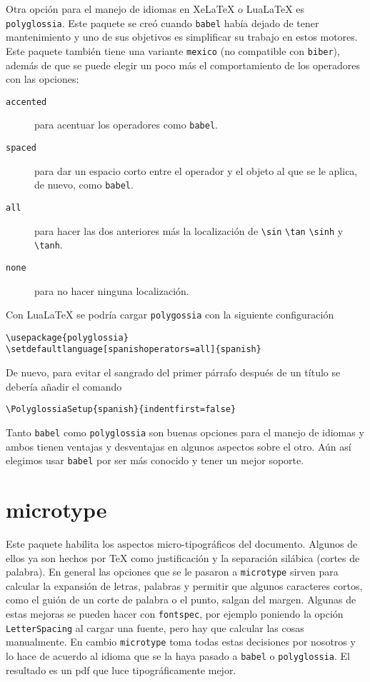 Otra opción para el manejo de idiomas en Xe\LaTeX{} o Lua\LaTeX{} es
\texttt{polyglossia}. Este paquete se creó cuando \texttt{babel} había
dejado de tener mantenimiento y uno de sus objetivos es simplificar su
trabajo en estos motores. Este paquete también tiene una variante
\texttt{mexico} (no compatible con \texttt{biber}), además de que se puede
elegir un poco más el comportamiento de los operadores con las opciones:
\begin{description}
  \item[\texttt{accented}] para acentuar los operadores como \texttt{babel}.
  \item[\texttt{spaced}] para dar un espacio corto entre el operador y el objeto al que se le aplica, de nuevo, como \texttt{babel}.
  \item[\texttt{all}] para hacer las dos anteriores más la localización de \verb|\sin| \verb|\tan| \verb|\sinh| y \verb|\tanh|.
  \item[\texttt{none}] para no hacer ninguna localización.
\end{description}
Con Lua\LaTeX{} se podría cargar \texttt{polygossia} con la siguiente
configuración
\begin{flushleft}
  \verb|\usepackage{polyglossia}| \\
  \verb|\setdefaultlanguage[spanishoperators=all]{spanish}|
\end{flushleft}

De nuevo, para evitar el sangrado del primer párrafo después de un título
se debería añadir el comando
\begin{flushleft}
  \verb|\PolyglossiaSetup{spanish}{indentfirst=false}|
\end{flushleft}

Tanto \texttt{babel} como \texttt{polyglossia} son buenas opciones para el
manejo de idiomas y ambos tienen ventajas y desventajas en algunos aspectos
sobre el otro. Aún así elegimos usar \texttt{babel} por ser más conocido y tener un mejor soporte.


\section{microtype}
Este paquete habilita los aspectos micro-tipográficos del documento. Algunos
de ellos ya son hechos por \TeX{} como justificación y la separación
silábica (cortes de palabra). En general las opciones que se le pasaron a
\texttt{microtype} sirven para calcular la expansión de letras, palabras y
permitir que algunos caracteres cortos, como el guión de un corte de palabra o
el punto, salgan del margen. Algunas de estas mejoras se pueden hacer con
\texttt{fontspec}, por ejemplo poniendo la opción \texttt{LetterSpacing} al
cargar una fuente, pero hay que calcular las cosas manualmente. En cambio
\texttt{microtype} toma todas estas decisiones por nosotros y lo hace
de acuerdo al idioma que se la haya pasado a \texttt{babel} o
\texttt{polyglossia}. El resultado es un pdf que luce tipográficamente mejor.


